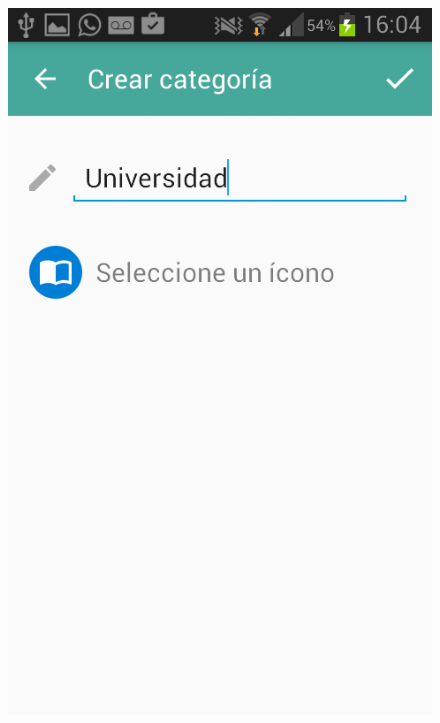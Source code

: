 \begin{figure}[ht]
\centering
\begin{minipage}{.5\textwidth}
  \centering
  \includegraphics[scale=0.30,type=png,ext=.png,read=.png]{imagenes/Screenshots/create_category1}
  \captionsetup{justification=centering}
  \label{fig:interfazCrearCategoria}
\end{minipage}%
\begin{minipage}{.5\textwidth}
\centering

\end{minipage}
\end{figure}
